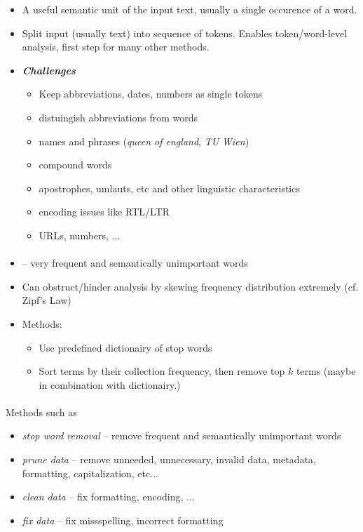 \documentclass[10pt,twocolumn]{article}
\begin{document}
\begin{itemize}
\item \textbf{} A useful semantic unit of the input text, usually a
  single occurence of a word.
\item \textbf{} Split input (usually text) into sequence of
  tokens. Enables token/word-level analysis, first step for many other methods.
\item \textbf{\textit{Challenges}}
  \begin{itemize}
  \item Keep abbreviations, dates, numbers as single tokens
  \item distuingish abbreviations from words
  \item names and phrases (\textit{queen of england}, \textit{TU Wien})
  \item compound words
  \item apostrophes, umlauts, etc and other linguistic characteristics
  \item encoding issues like RTL/LTR
  \item URLs, numbers, ...
  \end{itemize}
\end{itemize}


\paragraph{}
\begin{itemize}
\item {} -- very frequent and semantically unimportant words
\item Can obstruct/hinder analysis by skewing frequency distribution extremely
  (cf. Zipf's Law)
\item Methods:
  \begin{itemize}
  \item Use predefined dictionairy of stop words
  \item Sort terms by their collection frequency, then remove top $k$ terms
    (maybe in combination with dictionairy.)
  \end{itemize}

\end{itemize}


\paragraph{}  Methods such as
\begin{itemize}
\item \textit{stop word removal} -- remove frequent and semantically unimportant
  words
\item \textit{prune data} -- remove unneeded, unnecessary, invalid data,
  metadata, formatting, capitalization, etc...
\item \textit{clean data} -- fix formatting, encoding, ...
\item \textit{fix data} -- fix missspelling, incorrect formatting 
\end{itemize}
 
\end{document}
